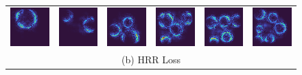 \documentclass[letterpaper]{article} %
\begin{document}
\begin{figure}[!htbp]
\begin{tabular}{cccccc}
\multicolumn{1}{c}{\includegraphics[width=0.125\linewidth]{saliency/hrr/circle/swap_1.png}} \hspace{-12pt} &  \multicolumn{1}{c}{\includegraphics[width=0.125\linewidth]{saliency/hrr/circle/swap_2.png}} \hspace{-12pt} & \multicolumn{1}{c}{\includegraphics[width=0.125\linewidth]{saliency/hrr/circle/swap_3.png}} \hspace{-12pt} & \multicolumn{1}{c}{\includegraphics[width=0.125\linewidth]{saliency/hrr/circle/swap_4.png}} \hspace{-12pt} & \multicolumn{1}{c}{\includegraphics[width=0.125\linewidth]{saliency/hrr/circle/swap_5.png}} \hspace{-12pt} & \multicolumn{1}{c}{\includegraphics[width=0.125\linewidth]{saliency/hrr/circle/swap_6.png}} \\ 
\multicolumn{6}{c}{(b) HRR Loss} \\


\end{tabular}
\end{figure}
\end{document}
